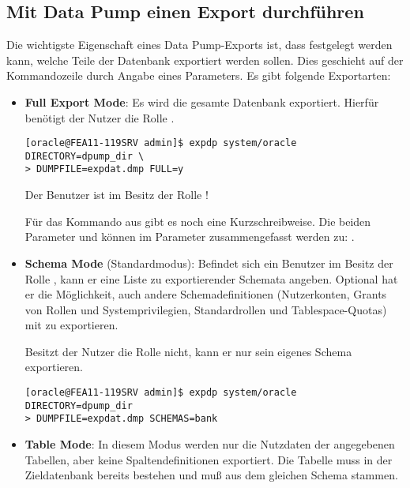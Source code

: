       \subsection{Mit Data Pump einen Export durchf\"uhren}
        Die wichtigste Eigenschaft eines Data Pump-Exports ist, dass festgelegt werden kann, welche Teile der Datenbank exportiert werden sollen. Dies geschieht auf der Kommandozeile durch Angabe eines Parameters. Es gibt folgende Exportarten:
        \begin{itemize}
          \item \textbf{Full Export Mode}: Es wird die gesamte Datenbank exportiert. Hierf\"ur ben\"otigt der Nutzer die Rolle .
          \begin{lstlisting}[caption={Full Database Export},label=admin901,language=expdp_impdp,emph={[9]DIRECTORY},emphstyle={[9]\sffamily\color{blue}}]
[oracle@FEA11-119SRV admin]$ expdp system/oracle DIRECTORY=dpump_dir \
> DUMPFILE=expdat.dmp FULL=y
          \end{lstlisting}
          \begin{merke}
            Der Benutzer  ist im Besitz der Rolle !
          \end{merke}
          F\"ur das Kommando aus  gibt es noch eine Kurzschreibweise. Die beiden Parameter  und  k\"onnen im Parameter  zusammengefasst werden zu: .
\clearpage
          \item \textbf{Schema Mode} (Standardmodus): Befindet sich ein Benutzer im Besitz der Rolle , kann er eine Liste zu exportierender Schemata angeben. Optional hat er die M\"oglichkeit, auch andere Schemadefinitionen (Nutzerkonten, Grants von Rollen und Systemprivilegien, Standardrollen und Tablespace-Quotas) mit zu exportieren.

          Besitzt der Nutzer die Rolle  nicht, kann er nur sein eigenes Schema exportieren.
          \begin{lstlisting}[caption={Schema Export},label=admin902,language=expdp_impdp,emph={[9]DIRECTORY},emphstyle={[9]\sffamily\color{blue}}]
[oracle@FEA11-119SRV admin]$ expdp system/oracle DIRECTORY=dpump_dir
> DUMPFILE=expdat.dmp SCHEMAS=bank
          \end{lstlisting}
          \item \textbf{Table Mode}: In diesem Modus werden nur die Nutzdaten der angegebenen Tabellen, aber keine Spaltendefinitionen exportiert. Die Tabelle muss in der Zieldatenbank bereits bestehen und mu\ss{} aus dem gleichen Schema stammen.


\end{itemize}
